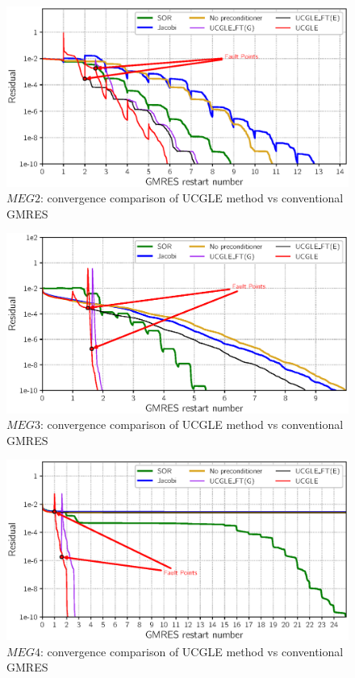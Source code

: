\begin{figure}[htbp]
	\centering
	\includegraphics[width=6.2in]{fig/convergence2.eps}
	\caption{$MEG2$: convergence comparison of UCGLE method vs conventional GMRES}
	\label{fig:conv2}
\end{figure}

\begin{figure}[htbp]
	\centering
	\includegraphics[width=6.2in]{fig/convergence3.eps}
	\caption{$MEG3$: convergence comparison of UCGLE method vs conventional GMRES}
	\label{fig:conv3}
\end{figure}

\begin{figure}[htbp]
	\centering
	\includegraphics[width=6.2in]{fig/convergence4.eps}
	\caption{$MEG4$: convergence comparison of UCGLE method vs conventional GMRES}
	\label{fig:conv4}
\end{figure}

